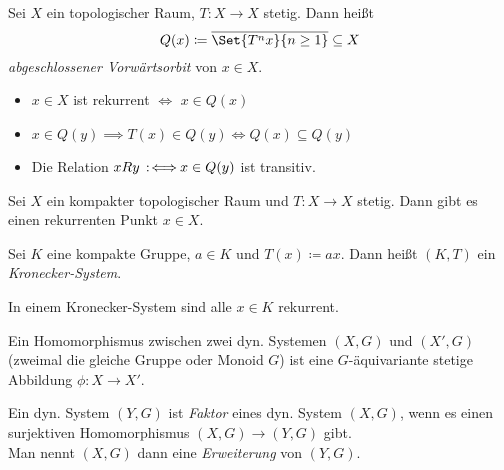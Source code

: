 \documentclass{cheat-sheet}
\newcommand{\clos}[1]{\overline{#1}} %
\begin{document}
\begin{defn}
  Sei $X$ ein topologischer Raum, $T : X \to X$ stetig. Dann heißt
  \[ Q(x) \coloneqq \clos{\Set{T^n x}{n \geq 1}} \subseteq X \]
  \emph{abgeschlossener Vorwärtsorbit} von $x \in X$.
\end{defn}

\begin{lem}
  \begin{itemize}
    \item $x \in X$ ist rekurrent $\iff$ $x \in Q(x)$
    \item $x \in Q(y) \implies T(x) \in Q(y) \iff Q(x) \subseteq Q(y)$
    \item Die Relation $xRy \!\!\enspace:\!\iff\!\! x \in Q(y)$ ist transitiv.
  \end{itemize}
\end{lem}

\begin{thm}
  Sei $X$ ein kompakter topologischer Raum und $T : X \to X$ stetig.
  Dann gibt es einen rekurrenten Punkt $x \in X$.
\end{thm}

\begin{defn}
  Sei $K$ eine kompakte Gruppe, $a \in K$ und $T(x) \coloneqq ax$. Dann heißt $(K, T)$ ein \emph{Kronecker-System}.
\end{defn}

\begin{thm}
  In einem Kronecker-System sind alle $x \in K$ rekurrent.
\end{thm}


\begin{defn}
  Ein Homomorphismus zwischen zwei dyn. Systemen $(X, G)$ und $(X', G)$ (zweimal die gleiche Gruppe oder Monoid $G$) ist eine $G$-äquivariante stetige Abbildung $\phi : X \to X'$.
\end{defn}

\begin{defn}
  Ein dyn. System $(Y, G)$ ist \emph{Faktor} eines dyn. System $(X, G)$, wenn es einen surjektiven Homomorphismus $(X, G) \to (Y, G)$ gibt. \\
  Man nennt $(X, G)$ dann eine \emph{Erweiterung} von $(Y, G)$.
\end{defn}
\end{document}
